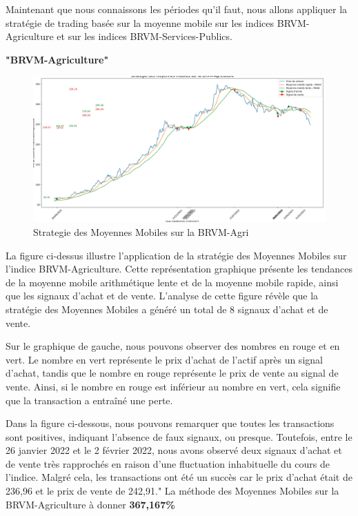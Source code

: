\begin{itemize}
  {Maintenant que nous connaissons les périodes qu'il faut, nous allons
  appliquer la stratégie de trading basée sur la moyenne mobile sur les
  indices BRVM-Agriculture et sur les indices BRVM-Services-Publics.}

  \textbf{"BRVM-Agriculture"}

  \begin{figure}
  \hypertarget{fig:Strategieux20desux20Moyennesux20Mobilesux20surux20laux20BRVM-Agri}{%
  \centering
  \includegraphics{img/MA-agri.jpg}
  \caption{Strategie des Moyennes Mobiles sur la
  BRVM-Agri}\label{fig:Strategieux20desux20Moyennesux20Mobilesux20surux20laux20BRVM-Agri}
  }
  \end{figure}

  La figure ci-dessus illustre l'application de la stratégie des
  Moyennes Mobiles sur l'indice BRVM-Agriculture. Cette représentation
  graphique présente les tendances de la moyenne mobile arithmétique
  lente et de la moyenne mobile rapide, ainsi que les signaux d'achat et
  de vente. L'analyse de cette figure révèle que la stratégie des
  Moyennes Mobiles a généré un total de 8 signaux d'achat et de vente.

  Sur le graphique de gauche, nous pouvons observer des nombres en rouge
  et en vert. Le nombre en vert représente le prix d'achat de l'actif
  après un signal d'achat, tandis que le nombre en rouge représente le
  prix de vente au signal de vente. Ainsi, si le nombre en rouge est
  inférieur au nombre en vert, cela signifie que la transaction a
  entraîné une perte.

  Dans la figure ci-dessous, nous pouvons remarquer que toutes les
  transactions sont positives, indiquant l'absence de faux signaux, ou
  presque. Toutefois, entre le 26 janvier 2022 et le 2 février 2022,
  nous avons observé deux signaux d'achat et de vente très rapprochés en
  raison d'une fluctuation inhabituelle du cours de l'indice. Malgré
  cela, les transactions ont été un succès car le prix d'achat était de
  236,96 et le prix de vente de 242,91." La méthode des Moyennes Mobiles
  sur la BRVM-Agriculture à donner \textbf{367,167\%}


\end{itemize}
